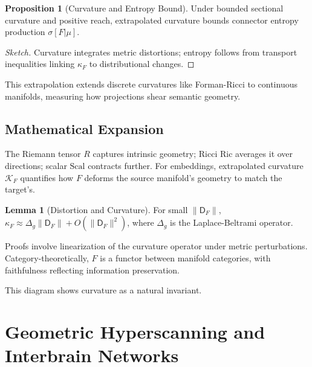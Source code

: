 \documentclass{article}
\theoremstyle{definition}
\newtheorem{lemma}[theorem]{Lemma}
\newtheorem{proposition}[theorem]{Proposition}
\begin{document}
\begin{proposition}[Curvature and Entropy Bound]
Under bounded sectional curvature and positive reach, extrapolated curvature bounds connector entropy production $\sigma[F|\mu]$.
\end{proposition}

\begin{proof}[Sketch]
Curvature integrates metric distortions; entropy follows from transport inequalities linking $\kappa_F$ to distributional changes.
\end{proof}

This extrapolation extends discrete curvatures like Forman-Ricci \cite{forman2003bochner} to continuous manifolds, measuring how projections shear semantic geometry.

\subsection{Mathematical Expansion}

The Riemann tensor $R$ captures intrinsic geometry; Ricci $\mathrm{Ric}$ averages it over directions; scalar $\mathrm{Scal}$ contracts further. For embeddings, extrapolated curvature $\mathcal{K}_F$ quantifies how $F$ deforms the source manifold's geometry to match the target's.

\begin{lemma}[Distortion and Curvature]
For small $\|\mathsf{D}_F\|$, $\kappa_F \approx \Delta_g \|\mathsf{D}_F\| + O(\|\mathsf{D}_F\|^2)$, where $\Delta_g$ is the Laplace-Beltrami operator.
\end{lemma}

Proofs involve linearization of the curvature operator under metric perturbations. Category-theoretically, $F$ is a functor between manifold categories, with faithfulness reflecting information preservation.


This diagram shows curvature as a natural invariant.

\section{Geometric Hyperscanning and Interbrain Networks}
\end{document}

